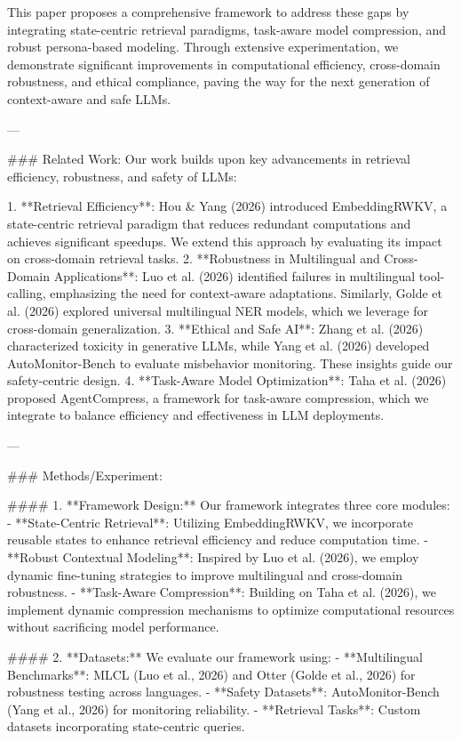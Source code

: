 This paper proposes a comprehensive framework to address these gaps by integrating state-centric retrieval paradigms, task-aware model compression, and robust persona-based modeling. Through extensive experimentation, we demonstrate significant improvements in computational efficiency, cross-domain robustness, and ethical compliance, paving the way for the next generation of context-aware and safe LLMs.

---

### Related Work:
Our work builds upon key advancements in retrieval efficiency, robustness, and safety of LLMs:

1. **Retrieval Efficiency**: Hou & Yang (2026) introduced EmbeddingRWKV, a state-centric retrieval paradigm that reduces redundant computations and achieves significant speedups. We extend this approach by evaluating its impact on cross-domain retrieval tasks.
2. **Robustness in Multilingual and Cross-Domain Applications**: Luo et al. (2026) identified failures in multilingual tool-calling, emphasizing the need for context-aware adaptations. Similarly, Golde et al. (2026) explored universal multilingual NER models, which we leverage for cross-domain generalization.
3. **Ethical and Safe AI**: Zhang et al. (2026) characterized toxicity in generative LLMs, while Yang et al. (2026) developed AutoMonitor-Bench to evaluate misbehavior monitoring. These insights guide our safety-centric design.
4. **Task-Aware Model Optimization**: Taha et al. (2026) proposed AgentCompress, a framework for task-aware compression, which we integrate to balance efficiency and effectiveness in LLM deployments.

---

### Methods/Experiment:

#### 1. **Framework Design:**
Our framework integrates three core modules:
   - **State-Centric Retrieval**: Utilizing EmbeddingRWKV, we incorporate reusable states to enhance retrieval efficiency and reduce computation time.
   - **Robust Contextual Modeling**: Inspired by Luo et al. (2026), we employ dynamic fine-tuning strategies to improve multilingual and cross-domain robustness.
   - **Task-Aware Compression**: Building on Taha et al. (2026), we implement dynamic compression mechanisms to optimize computational resources without sacrificing model performance.

#### 2. **Datasets:**
We evaluate our framework using:
   - **Multilingual Benchmarks**: MLCL (Luo et al., 2026) and Otter (Golde et al., 2026) for robustness testing across languages.
   - **Safety Datasets**: AutoMonitor-Bench (Yang et al., 2026) for monitoring reliability.
   - **Retrieval Tasks**: Custom datasets incorporating state-centric queries.

